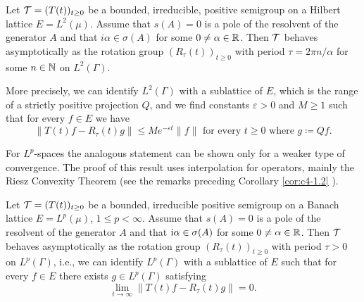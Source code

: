\begin{proposition}\label{prop:c4-2.13}
Let $\mathcal{T} = (T(t))_{t\geq 0}$ be a bounded, irreducible, positive semigroup on a Hilbert lattice $E = L^{2}(\mu)$.
Assume that $s(A) = 0$ is a pole of the resolvent of the generator $A$ and that $i\alpha \in \sigma(A)$ for some $0 \neq \alpha \in \mathbb{R}$.
Then $\mathcal{T}$ behaves asymptotically as the rotation group $(R_{\tau}(t))_{t \geq 0}$ with period $\tau = 2\pi n/\alpha$ for some $n \in \mathbb{N}$ on $L^{2}(\Gamma)$.

More precisely, we can identify $L^{2}(\Gamma)$ with a sublattice of $E$, which is the range of a strictly positive projection $Q$, and we find constants $\varepsilon > 0$ and $M \geq 1$ such that for every $f \in E$ we have
\begin{equation}\label{eq:c4-2.11}
\|T(t)f - R_{\tau}(t)g\| \leq Me^{-\varepsilon t}\|f\| \text{ for every } t \geq 0 \text{ where } g \coloneqq Qf.
\end{equation}
\end{proposition}

For $L^{p}$-spaces the analogous statement can be shown only for a weaker type of convergence.
The proof of this result uses interpolation for operators, mainly the Riesz Convexity Theorem (see the remarks preceding Corollary \ref{cor:c4-1.2} ).

\begin{theorem}\label{thm:c4-2.14}
Let $\mathcal{T} = (T(t))_{t \geq 0}$ be a bounded, irreducible positive semigroup on a Banach lattice $E = L^{p}(\mu)$, $1 \leq p < \infty$.
Assume that $s(A) = 0$ is a pole of the resolvent of the generator $A$ and that $\mathrm{i}\alpha \in \sigma(A)$ for some $0 \neq \alpha \in \mathbb{R}$.
Then $\mathcal{T}$ behaves asymptotically as the rotation group $(R_{\tau}(t))_{t \geq 0}$ with period $\tau > 0$ on $L^{p}(\Gamma)$, i.e., we can identify $L^{p}(\Gamma)$ with a sublattice of $E$ such that for every $f \in E$ there exists $g \in L^{p}(\Gamma)$ satisfying
\begin{equation}\label{eq:c4-2.12}
\lim_{t \to \infty} \|T(t)f - R_{\tau}(t)g\| = 0.
\end{equation}
\end{theorem}


